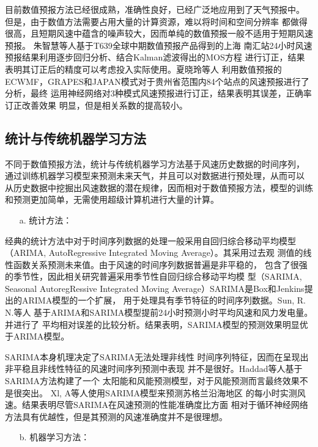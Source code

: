 \documentclass[AutoFakeBold]{LZUThesis}
\begin{document}
目前数值预报方法已经很成熟，准确性良好，已经广泛地应用到了天气预报中。
但是，由于数值方法需要占用大量的计算资源，难以将时间和空间分辨率
都做得很高，且短期风速中蕴含的噪声较大，因而单纯的数值预报一般不适用于短期风速预报。
朱智慧等人\cite{朱智慧2010T639}基于T639全球中期数值预报产品得到的上海
南汇站24小时风速预报结果利用逐步回归分析、结合Kalman滤波得出的MOS方程
进行订正，结果表明其订正后的精度可以考虑投入实际使用。夏晓玲等人
\cite{夏晓玲2019贵州省数值预报风速产品检验及订正}利用数值预报的
ECWMF，GRAPES和JAPAN模式对于贵州省范围内84个站点的风速预报进行了分析，最终
运用神经网络对3种模式风速预报进行订正，结果表明其误差，正确率订正改善效果
明显，但是相关系数的提高较小。

\subsection{统计与传统机器学习方法}
不同于数值预报方法，统计与传统机器学习方法基于风速历史数据的时间序列，
通过训练机器学习模型来预测未来天气，并且可以对数据进行预处理，从而可以
从历史数据中挖掘出风速数据的潜在规律，因而相对于数值预报方法，模型的训练
和预测更加简单，无需使用超级计算机进行大量的计算。

\begin{itemize}
\item[a. ] 统计方法：
\end{itemize}

经典的统计方法中对于时间序列数据的处理一般采用自回归综合移动平均模型
（ARIMA, AutoRegressive Integrated Moving Average）。其采用过去观
测值的线性函数关系预测未来值。由于风速的时间序列数据普遍是非平稳的，
包含了很强的季节性，因此相关研究普遍采用季节性自回归综合移动平均模
型（SARIMA, Seasonal AutoregRessive Integrated 
Moving Average）SARIMA是Box和Jenkins提出的ARIMA模型的一个扩展，
用于处理具有季节特征的时间序列数据。Sun, R. N.等人\cite{2017Forecast}
基于ARIMA和SARIMA模型提前24小时预测小时平均风速和风力发电量。并进行了
平均相对误差的比较分析。结果表明，SARIMA模型的预测效果明显优于ARIMA模型。

SARIMA本身机理决定了SARIMA无法处理非线性
时间序列特征，因而在呈现出非平稳且非线性特征的风速时间序列预测中表现
并不是很好。Haddad等人\cite{haddad2019wind}基于SARIMA方法构建了一个
太阳能和风能预测模型，对于风能预测而言最终效果不是很突出。
Xl, A等人\cite{2021Short}使用SARIMA模型来预测苏格兰沿海地区
的每小时实测风速。结果表明尽管SARIMA在风速预测的性能准确度比方面
相对于循环神经网络方法具有优越性，但是其预测的风速准确度并不是很理想。

\begin{itemize}
\item[b. ] 机器学习方法：
\end{itemize}
 
\end{document}
